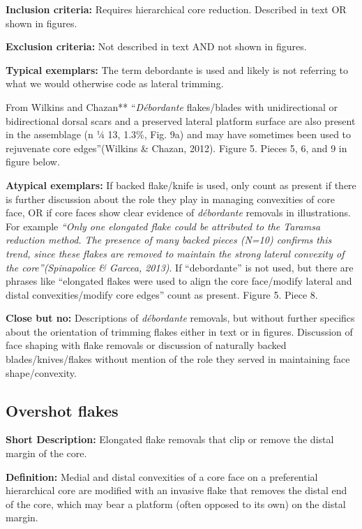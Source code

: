 \documentclass[
]{article}
\begin{document}
\textbf{Inclusion criteria:} Requires hierarchical core reduction.
Described in text OR shown in figures.

\textbf{Exclusion criteria:} Not described in text AND not shown in
figures.

\textbf{Typical exemplars:} The term debordante is used and likely is
not referring to what we would otherwise code as lateral trimming.

From Wilkins and Chazan** ``\emph{Débordante} flakes/blades with
unidirectional or bidirectional dorsal scars and a preserved lateral
platform surface are also present in the assemblage (n ¼ 13, 1.3\%, Fig.
9a) and may have sometimes been used to rejuvenate core edges''(Wilkins
\& Chazan, 2012). Figure 5. Pieces 5, 6, and 9 in figure below.

\textbf{Atypical exemplars:} If backed flake/knife is used, only count
as present if there is further discussion about the role they play in
managing convexities of core face, OR if core faces show clear evidence
of \emph{débordante} removals in illustrations. For example \emph{``Only
one elongated flake could be attributed to the Taramsa reduction method.
The presence of many backed pieces (N=10) confirms this trend, since
these flakes are removed to maintain the strong lateral convexity of the
core''(Spinapolice \& Garcea, 2013)}. If ``debordante'' is not used, but
there are phrases like ``elongated flakes were used to align the core
face/modify lateral and distal convexities/modify core edges'' count as
present. Figure 5. Piece 8.

\textbf{Close but no:} Descriptions of \emph{débordante} removals, but
without further specifics about the orientation of trimming flakes
either in text or in figures. Discussion of face shaping with flake
removals or discussion of naturally backed blades/knives/flakes without
mention of the role they served in maintaining face shape/convexity.

\hypertarget{overshot-flakes}{%
\subsection{Overshot flakes}\label{overshot-flakes}}

\textbf{Short Description:} Elongated flake removals that clip or remove
the distal margin of the core.

\textbf{Definition:} Medial and distal convexities of a core face on a
preferential hierarchical core are modified with an invasive flake that
removes the distal end of the core, which may bear a platform (often
opposed to its own) on the distal margin.
\end{document}
